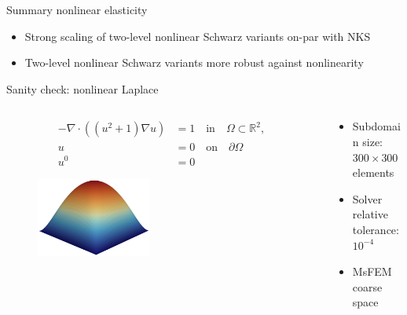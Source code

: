  \begin{frame}[noframenumbering]{Summary nonlinear elasticity}
   \begin{itemize}
     \item Strong scaling of two-level nonlinear Schwarz variants on-par with NKS
     \item Two-level nonlinear Schwarz variants more robust against nonlinearity
   \end{itemize}
 \end{frame}
\begin{frame}[noframenumbering]{Sanity check: nonlinear Laplace}
    \begin{columns}
        \begin{column}{0.47\textwidth}
                \begin{align*}
                    -\nabla\cdot((u^2+1)\nabla u)&=1\quad \text{in}\quad \Omega\subset\mathbb{R}^2,\\
                    u &= 0\quad\text{on}\quad\partial\Omega\\
                    u^0 &= 0
                \end{align*}
                \begin{figure}
                    \centering
                    \includegraphics[width=0.45\textwidth]{images/laplace}
                \end{figure}
        \end{column}
        \begin{column}{0.53\textwidth}
               \begin{itemize}
                \setlength{\itemsep}{10pt}
                \item Subdomain size: $300\times300$ elements
                \item Solver relative tolerance: $10^{-4}$
                \item MsFEM coarse space
               \end{itemize} 
        \end{column}
    \end{columns}
 \end{frame}
 
